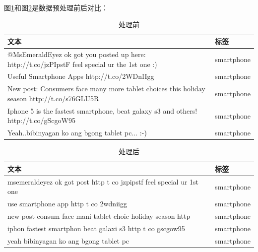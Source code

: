 图\ref{tab:before}和图\ref{tab:after}是数据预处理前后对比：

\begin{table}[htb]                                                                    \begin{singlespace}                                                          
    \centering\caption{处理前}\label{tab:before}
    \renewcommand{\arraystretch}{1.5} %
    \begin{tabular}{p{13.5cm} p{2.5cm}}\hline
      文本 & 标签 \\ \hline                                                
      @MsEmeraldEyez ok got you posted up here: http://t.co/jzPIpstF feel special ur the 1st one :)  & smartphone \\
      Useful Smartphone Apps  http://t.co/2WDnIIgg  & smartphone \\
      New post: Consumers face many more tablet choices this holiday season http://t.co/s76GLU5R  & smartphone \\
      Iphone 5 is the fastest smartphone, beat galaxy s3 and others! http://t.co/gScgoW95  & smartphone \\
      Yeah..bibinyagan ko ang bgong tablet pc... :-)  & smartphone \\
      \end{tabular}                                                              
  \end{singlespace}
\end{table}               

\begin{table}[ht]                                                                  \begin{singlespace}                                                          
    \centering\caption{处理后}\label{tab:after}
    \renewcommand{\arraystretch}{1.5} %
    \begin{tabular}{p{13.5cm} p{2.5cm}}\hline
      文本 & 标签 \\ \hline                                                
      msemeraldeyez ok got post http t co jzpipstf feel special ur 1st one  & smartphone \\
      use smartphone app http t co 2wdniigg  & smartphone \\
      new post consum face mani tablet choic holiday season http  & smartphone \\
      iphon fastest smartphon beat galaxi s3 http t co gscgow95 & smartphone \\
      yeah bibinyagan ko ang bgong tablet pc  & smartphone \\
      \end{tabular}                                                              
  \end{singlespace}
\end{table}               


